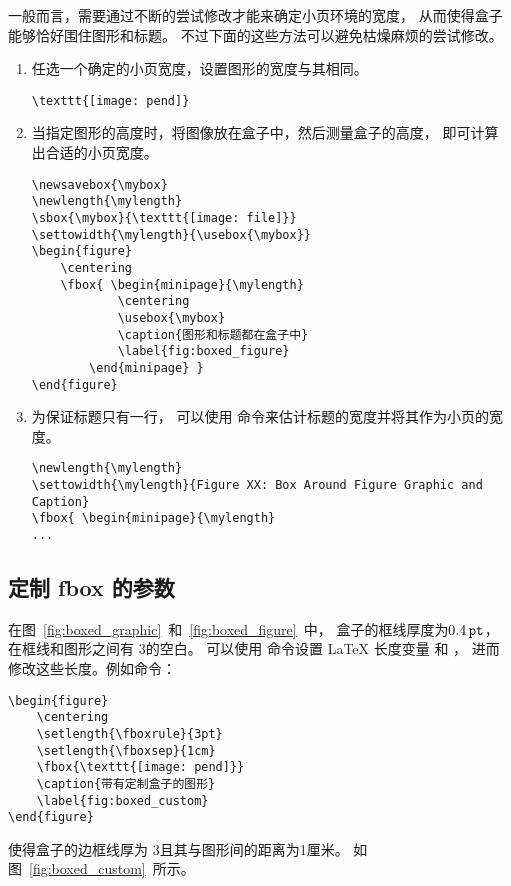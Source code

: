 一般而言，需要通过不断的尝试修改才能来确定小页环境的宽度，
从而使得盒子能够恰好围住图形和标题。
不过下面的这些方法可以避免枯燥麻烦的尝试修改。
\begin{enumerate}
	\item 任选一个确定的小页宽度，设置图形的宽度与其相同。
\begin{lstlisting}
\texttt{[image: pend]}
\end{lstlisting}
	\item 当指定图形的高度时，将图像放在盒子中，然后测量盒子的高度，
	即可计算出合适的小页宽度。
\begin{lstlisting}
\newsavebox{\mybox}
\newlength{\mylength}
\sbox{\mybox}{\texttt{[image: file]}}
\settowidth{\mylength}{\usebox{\mybox}}
\begin{figure}
	\centering
	\fbox{ \begin{minipage}{\mylength}
			\centering
			\usebox{\mybox}
			\caption{图形和标题都在盒子中}
			\label{fig:boxed_figure}
		\end{minipage} }
\end{figure}
\end{lstlisting}

	\item 为保证标题只有一行，
	可以使用  命令来估计标题的宽度并将其作为小页的宽度。
\begin{lstlisting}
\newlength{\mylength} 
\settowidth{\mylength}{Figure XX: Box Around Figure Graphic and Caption} 
\fbox{ \begin{minipage}{\mylength} 
...
\end{lstlisting}
\end{enumerate}

\subsection{定制 fbox 的参数} \label{ssec:customizefbox}

在图~\ref{fig:boxed_graphic}~和~\ref{fig:boxed_figure}~中，
盒子的框线厚度为$0.4\,\mathtt{pt}$，在框线和图形之间有 3\pt 的空白。
可以使用  命令设置 \LaTeX{} 长度变量  和 ，
进而修改这些长度。例如命令：
\begin{lstlisting}
\begin{figure}
	\centering
	\setlength{\fboxrule}{3pt}
	\setlength{\fboxsep}{1cm}
	\fbox{\texttt{[image: pend]}}
	\caption{带有定制盒子的图形}
	\label{fig:boxed_custom}
\end{figure}
\end{lstlisting}
使得盒子的边框线厚为 3\pt 且其与图形间的距离为1厘米。
如图~\ref{fig:boxed_custom}~所示。

